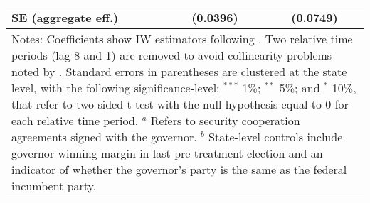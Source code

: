 \begin{table}[htbp]
{\begin{tabular}{lcc}
SE (aggregate eff.)        &              (0.0396)       &           (0.0749)   \\
\hline \hline
\multicolumn{3}{p{0.8\textwidth}}{\footnotesize{Notes: Coefficients show IW estimators following \citet{abraham_sun_2020}. Two relative time periods (lag 8 and 1) are removed to avoid collinearity problems noted by \citet{abraham_sun_2020}. Standard errors in parentheses are clustered at the state level, with the following significance-level: $^{***}$ 1\%; $^{**}$ 5\%; and $^*$ 10\%, that refer to two-sided t-test with the null hypothesis equal to 0 for each relative time period. $^a$ Refers to security cooperation agreements signed with the governor. $^b$ State-level controls include governor winning margin in last pre-treatment election and an indicator of whether the governor's party is the same as the federal incumbent party.}} \\
\end{tabular}
}
\end{table}
